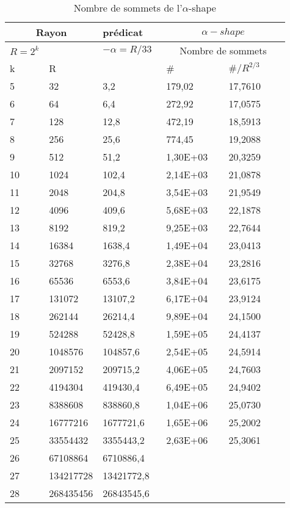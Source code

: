 \begin{table}[H]
  \begin{tabular}{|p{0.09\linewidth}|p{0.13\linewidth}||p{0.23\linewidth}||p{0.23\linewidth}|p{0.23\linewidth}|}
    \hline
    \multicolumn{2}{|c||}{Rayon} & prédicat               & \multicolumn{2}{|c|}{$\alpha-shape$} \\  \hline 
    $R=2^k$  &                   & $-\alpha = R/33$ & \multicolumn{2}{|c|}{Nombre de sommets} \\ \hline
    k        & R                 &                        & \# & $\# / R^{2/3}$ \\ 
    \hline
    5  & 32        & 3,2        & 179,02   & 17,7610\\
    6  & 64        & 6,4        & 272,92   & 17,0575\\
    7  & 128       & 12,8       & 472,19   & 18,5913\\
    8  & 256       & 25,6       & 774,45   & 19,2088\\
    9  & 512       & 51,2       & 1,30E+03 & 20,3259\\
    10 & 1024      & 102,4      & 2,14E+03 & 21,0878\\
    11 & 2048      & 204,8      & 3,54E+03 & 21,9549\\
    12 & 4096      & 409,6      & 5,68E+03 & 22,1878\\
    13 & 8192      & 819,2      & 9,25E+03 & 22,7644\\
    14 & 16384     & 1638,4     & 1,49E+04 & 23,0413\\
    15 & 32768     & 3276,8     & 2,38E+04 & 23,2816\\
    16 & 65536     & 6553,6     & 3,84E+04 & 23,6175\\
    17 & 131072    & 13107,2    & 6,17E+04 & 23,9124\\
    18 & 262144    & 26214,4    & 9,89E+04 & 24,1500\\
    19 & 524288    & 52428,8    & 1,59E+05 & 24,4137\\
    20 & 1048576   & 104857,6   & 2,54E+05 & 24,5914\\
    21 & 2097152   & 209715,2   & 4,06E+05 & 24,7603\\
    22 & 4194304   & 419430,4   & 6,49E+05 & 24,9402\\
    23 & 8388608   & 838860,8   & 1,04E+06 & 25,0730\\
    24 & 16777216  & 1677721,6  & 1,65E+06 & 25,2002\\
    25 & 33554432  & 3355443,2  & 2,63E+06 & 25,3061\\
    26 & 67108864  & 6710886,4  &    &  \\
    27 & 134217728 & 13421772,8 &    &  \\
    28 & 268435456 & 26843545,6 &    &  \\

    \hline
  \end{tabular} 
  \caption{Nombre de sommets de l'$\alpha$-shape}
\end{table}

